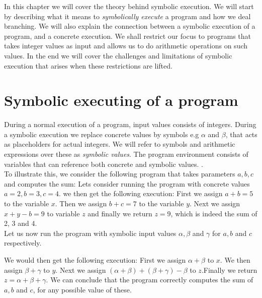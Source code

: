 In this chapter we will cover the theory behind symbolic execution. We will start by describing what it means to \emph{symbolically execute} a program and how we deal branching. We will also explain the connection between a symbolic execution of a program, and a concrete execution. We shall restrict our focus to programs that takes integer values as input and allows us to do arithmetic operations on such values. In the end we will cover the challenges and limitations of symbolic execution that arises when these restrictions are lifted. 


\section{Symbolic executing of a program}
	
	During a normal execution of a program, input values consists of integers. During a symbolic execution we replace concrete values by symbols e.g $\alpha$ and $ \beta$, that acts as placeholders for actual integers. We will refer to symbols and arithmetic expressions over these as \emph{symbolic values}.
	 The program environment consists of variables that can reference both concrete and symbolic values. \cite{CadarSen13}.
	\\
	To illustrate this, we consider the following program that takes parameters $a, b, c$ and computes the sum:
	\sumprogram{}
	Lets consider running the program with concrete values $a = 2, b = 3, c = 4$. we then get the following execution:
	First we assign $a+b = 5$ to the variable $x$. Then we assign $b + c = 7$ to the variable $y$. Next we assign $x + y - b = 9$ to variable $z$ and finally we return $z = 9$, which is indeed the sum of 2, 3 and 4. 
	\\
	Let us now run the program with symbolic input values $\alpha, \beta$ and $\gamma$ for $a, b$ and $c$ respectively. 

	
	We would then get the following execution: First we assign $\alpha + \beta$ to $x$. We then assign $\beta + \gamma$ to $y$. Next we assign $(\alpha + \beta) + (\beta + \gamma) - \beta$ to $z$.Finally we return $z = \alpha + \beta + \gamma$. We can conclude that the program correctly computes the sum of $a, b$ and $c$, for any possible value of these.
	

